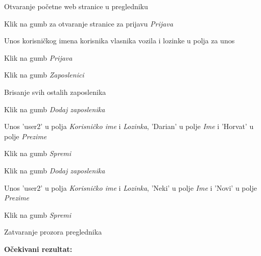 			\begin{packed_enum}
				
				\item Otvaranje početne web stranice u pregledniku
				\item Klik na gumb za otvaranje stranice za prijavu \textit{Prijava}
				\item Unos korisničkog imena korisnika vlasnika vozila i lozinke u polja za unos
				\item Klik na gumb \textit{Prijava}
				\item Klik na gumb \textit{Zaposlenici}
				\item Brisanje svih ostalih zaposlenika
				\item Klik na gumb \textit{Dodaj zaposlenika}
				\item Unos 'user2' u polja \textit{Korisničko ime} i \textit{Lozinka}, 'Darian' u polje \textit{Ime} i 'Horvat' u polje \textit{Prezime}
				\item Klik na gumb \textit{Spremi}
				\item Klik na gumb \textit{Dodaj zaposlenika}
				\item Unos 'user2' u polja \textit{Korisničko ime} i \textit{Lozinka}, 'Neki' u polje \textit{Ime} i 'Novi' u polje \textit{Prezime}
				\item Klik na gumb \textit{Spremi}
				\item Zatvaranje prozora preglednika
				
			\end{packed_enum}
			
			\noindent\textbf{Očekivani rezultat:}
			

